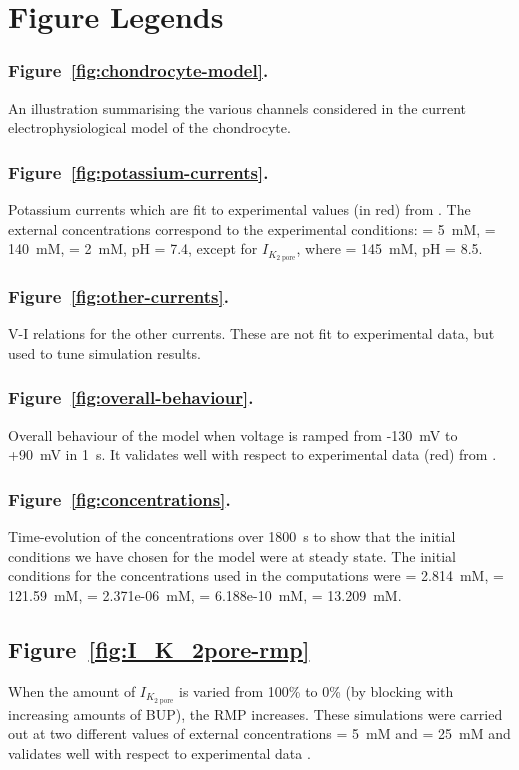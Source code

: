 \section*{Figure Legends}
\label{figures}

\subsubsection*{Figure~\ref{fig:chondrocyte-model}.}
An illustration summarising the various channels considered in the
current electrophysiological model of the chondrocyte.

\subsubsection*{Figure~\ref{fig:potassium-currents}.}
Potassium currents which are fit to experimental values (in red) from
\citet{Clarketal2011}. The external concentrations correspond to the
experimental conditions: \Ko = 5~mM, \Nao = 140~mM, \Cao = 2~mM, pH =
7.4, except for $I_{K_{\mathrm{2\; pore}}}$, where \Ko = 145~mM, pH = 8.5.

\subsubsection*{Figure~\ref{fig:other-currents}.}
V-I relations for the other currents. These are not fit to
experimental data, but used to tune simulation results.

\subsubsection*{Figure~\ref{fig:overall-behaviour}.}
Overall behaviour of the model when voltage is ramped from -130~mV to
+90~mV in 1~s. It validates well with respect to experimental data
(red) from \citet{Clarketal2011}.

\subsubsection*{Figure~\ref{fig:concentrations}.}
Time-evolution of the concentrations over 1800~s to show that the
initial conditions we have chosen for the model were at steady
state. The initial conditions for the concentrations used in the
computations were \Nai = 2.814~mM, \Ki = 121.59~mM, \Cai =
2.371e-06~mM, \Hi = 6.188e-10~mM, \Cli = 13.209~mM.

\subsection*{Figure~\ref{fig:I_K_2pore-rmp}}
When the amount of $I_{K_{\mathrm{2\; pore}}}$ is varied from 100\% to
0\% (by blocking with increasing amounts of BUP), the RMP
increases. These simulations were carried out at two different values
of external concentrations \Ko = 5~mM and \Ko = 25~mM and validates
well with respect to experimental data
\citep[Fig. 8B]{Clarketal2011}.

